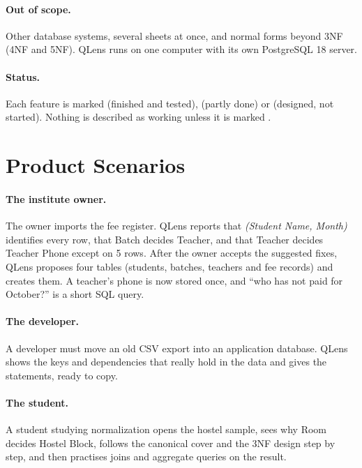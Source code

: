 \paragraph{Out of scope.} Other database systems, several sheets at once, and normal forms beyond 3NF
(4NF and 5NF). QLens runs on one computer with its own
PostgreSQL 18 server.

\paragraph{Status.} Each feature is marked \stdone{} (finished and tested), \stwip{} (partly done) or
\stplan{} (designed, not started). Nothing is described as working unless it is marked \stdone.

\section{Product Scenarios}
\label{sec:scenarios}

\paragraph{The institute owner.} \stdone{} The owner imports the fee register. QLens reports that
\emph{(Student Name, Month)} identifies every row, that Batch decides Teacher, and that Teacher decides
Teacher Phone except on 5 rows. After the owner accepts the suggested fixes, QLens proposes four tables
(students, batches, teachers and fee records) and creates them. A teacher's phone is now stored once,
and ``who has not paid for October?'' is a short SQL query.

\paragraph{The developer.} \stdone{} A developer must move an old CSV export into an application
database. QLens shows the keys and dependencies that really hold in the data and gives the
 statements, ready to copy.

\paragraph{The student.} \stdone{} A student studying normalization opens the hostel sample, sees why
Room decides Hostel Block, follows the canonical cover and the 3NF design step by step, and then
practises joins and aggregate queries on the result.
